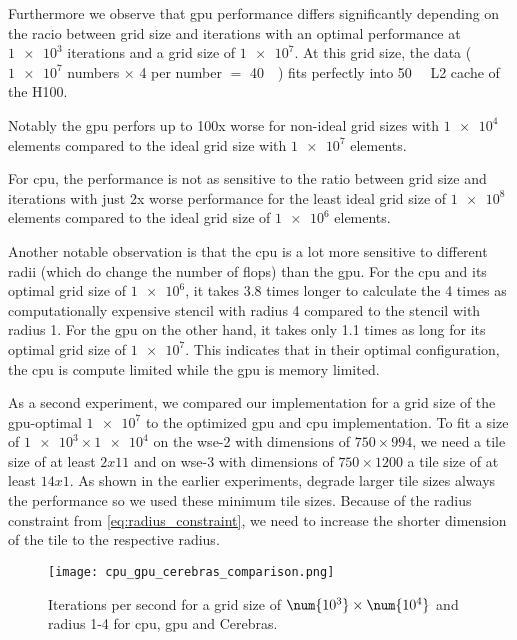 Furthermore we observe that \ac{gpu} performance differs significantly depending on the racio between grid size and iterations with an optimal performance at $\num{1e3}$ iterations and a grid size of $\num{1e7}$. At this grid size, the data ($\num{1e7}$ numbers $\times$ \qty{4}{\byte} per number $=$ \qty{40}{\mega\byte}) fits perfectly into \qty{50}{\mega\byte} L2 cache of the H100. 

Notably the \ac{gpu} perfors up to 100x worse for non-ideal grid sizes with $\num{1e4}$ elements compared to the ideal grid size with $\num{1e7}$ elements.

For \ac{cpu}, the performance is not as sensitive to the ratio between grid size and iterations with just 2x worse performance for the least ideal grid size of $\num{1e8}$ elements compared to the ideal grid size of $\num{1e6}$ elements.

Another notable observation is that the \ac{cpu} is a lot more sensitive to different radii (which do change the number of flops) than the \ac{gpu}. For the \ac{cpu} and its optimal grid size of $\num{1e6}$, it takes 3.8 times longer to calculate the 4 times as computationally expensive stencil with radius 4 compared to the stencil with radius 1. For the \ac{gpu} on the other hand, it takes only 1.1 times as long for its optimal grid size of $\num{1e7}$.
This indicates that in their optimal configuration, the \ac{cpu} is compute limited while the \ac{gpu} is memory limited.

As a second experiment, we compared our implementation for a grid size of the \ac{gpu}-optimal $\num{1e7}$ to the optimized \ac{gpu} and \ac{cpu} implementation. To fit a size of $\num{1e3}\times\num{1e4}$ on the \ac{wse}-2 with dimensions of $750\times994$, we need a tile size of at least $2x11$ and on \ac{wse}-3 with dimensions of $750\times1200$ a tile size of at least $14x1$. As shown in the earlier experiments, degrade larger tile sizes always the performance so we used these minimum tile sizes. Because of the radius constraint from \autoref{eq:radius_constraint}, we need to increase the shorter dimension of the tile to the respective radius.

\begin{figure}[h]
    \centering
    \texttt{[image: cpu\_gpu\_cerebras\_comparison.png]}
    \caption{Iterations per second for a grid size of $\num{10^3}\times\num{10^4}$ and radius 1-4 for \ac{cpu}, \ac{gpu} and Cerebras.}
    \label{fig:cpu_gpu_cerebras_comparison}
\end{figure}

